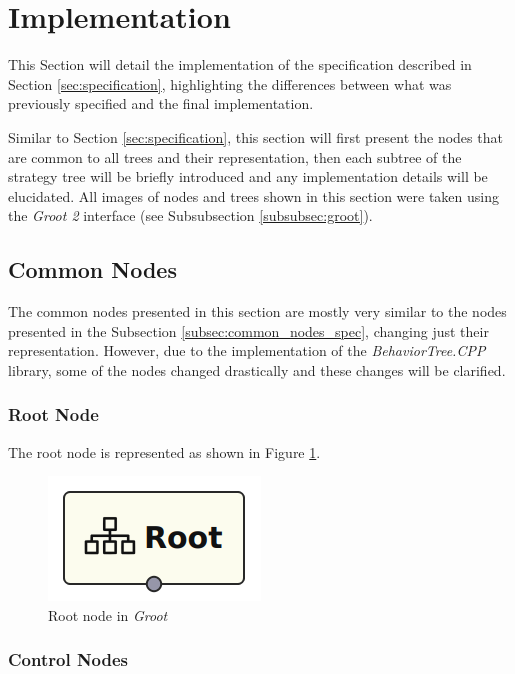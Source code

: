 \section{Implementation}
\label{sec:implementation}

This Section will detail the implementation of the specification described in Section \ref{sec:specification}, highlighting the differences between what was previously specified and the final implementation.

Similar to Section \ref{sec:specification}, this section will first present the nodes that are common to all trees and their representation, then each subtree of the strategy tree will be briefly introduced and any implementation details will be elucidated. All images of nodes and trees shown in this section were taken using the \textit{Groot 2} interface (see Subsubsection \ref{subsubsec:groot}).

\subsection{Common Nodes}
\label{subsec:common_nodes_impl}

The common nodes presented in this section are mostly very similar to the nodes presented in the Subsection \ref{subsec:common_nodes_spec}, changing just their representation. However, due to the implementation of the \textit{BehaviorTree.CPP} library, some of the nodes changed drastically and these changes will be clarified.

\subsubsection{Root Node}

The root node is represented as shown in Figure \ref{fig:root_node_impl}.

\begin{figure}[!h]
    \centering
    \includegraphics[width=0.15\linewidth]{chapters/development/images/RootNode.png}
    \caption{Root node in \textit{Groot}}
    \label{fig:root_node_impl}
\end{figure}

\subsubsection{Control Nodes}

